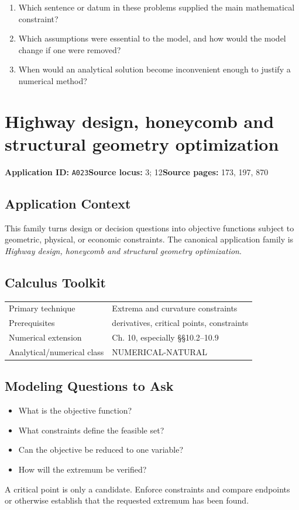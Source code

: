 \documentclass[11pt]{book}
\newcommand{\pid}[1]{\texttt{#1}}
\begin{document}
\begin{reflectionbox}\begin{enumerate}
\item Which sentence or datum in these problems supplied the main mathematical constraint?
\item Which assumptions were essential to the model, and how would the model change if one were removed?
\item When would an analytical solution become inconvenient enough to justify a numerical method?
\end{enumerate}\end{reflectionbox}
\chapter{Highway design, honeycomb and structural geometry optimization}\label{app:A023}
\textbf{Application ID:} \pid{A023}\quad \textbf{Source locus:} 3; 12\quad \textbf{Source pages:} 173, 197, 870
\section*{Application Context}
This family turns design or decision questions into objective functions subject to geometric, physical, or economic constraints. The canonical application family is \emph{Highway design, honeycomb and structural geometry optimization}.
\section*{Calculus Toolkit}
\begin{tabularx}{\textwidth}{@{}lX@{}}\toprule
Primary technique & Extrema and curvature constraints \\
Prerequisites & derivatives, critical points, constraints \\
Numerical extension & Ch. 10, especially §§10.2–10.9 \\
Analytical/numerical class & NUMERICAL-NATURAL \\
\bottomrule\end{tabularx}
\section*{Modeling Questions to Ask}\begin{itemize}
\item What is the objective function?
\item What constraints define the feasible set?
\item Can the objective be reduced to one variable?
\item How will the extremum be verified?
\end{itemize}
\begin{errorbox}A critical point is only a candidate. Enforce constraints and compare endpoints or otherwise establish that the requested extremum has been found.\end{errorbox}
\end{document}
